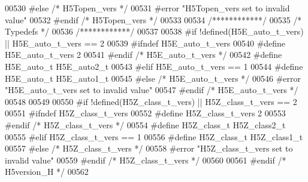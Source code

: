 \begin{DoxyCode}
00530 \textcolor{preprocessor}{#else }\textcolor{comment}{/* H5Topen\_vers */}\textcolor{preprocessor}{}
00531 \textcolor{preprocessor}{  #error "H5Topen\_vers set to invalid value"}
00532 \textcolor{preprocessor}{#endif }\textcolor{comment}{/* H5Topen\_vers */}\textcolor{preprocessor}{}
00533 
00534 \textcolor{comment}{/************/}
00535 \textcolor{comment}{/* Typedefs */}
00536 \textcolor{comment}{/************/}
00537 
00538 \textcolor{preprocessor}{#if !defined(H5E\_auto\_t\_vers) || H5E\_auto\_t\_vers == 2}
00539 \textcolor{preprocessor}{  #ifndef H5E\_auto\_t\_vers}
00540 \textcolor{preprocessor}{    #define H5E\_auto\_t\_vers 2}
00541 \textcolor{preprocessor}{  #endif }\textcolor{comment}{/* H5E\_auto\_t\_vers */}\textcolor{preprocessor}{}
00542 \textcolor{preprocessor}{  #define H5E\_auto\_t H5E\_auto2\_t}
00543 \textcolor{preprocessor}{#elif H5E\_auto\_t\_vers == 1}
00544 \textcolor{preprocessor}{  #define H5E\_auto\_t H5E\_auto1\_t}
00545 \textcolor{preprocessor}{#else }\textcolor{comment}{/* H5E\_auto\_t\_vers */}\textcolor{preprocessor}{}
00546 \textcolor{preprocessor}{  #error "H5E\_auto\_t\_vers set to invalid value"}
00547 \textcolor{preprocessor}{#endif }\textcolor{comment}{/* H5E\_auto\_t\_vers */}\textcolor{preprocessor}{}
00548 
00549 
00550 \textcolor{preprocessor}{#if !defined(H5Z\_class\_t\_vers) || H5Z\_class\_t\_vers == 2}
00551 \textcolor{preprocessor}{  #ifndef H5Z\_class\_t\_vers}
00552 \textcolor{preprocessor}{    #define H5Z\_class\_t\_vers 2}
00553 \textcolor{preprocessor}{  #endif }\textcolor{comment}{/* H5Z\_class\_t\_vers */}\textcolor{preprocessor}{}
00554 \textcolor{preprocessor}{  #define H5Z\_class\_t H5Z\_class2\_t}
00555 \textcolor{preprocessor}{#elif H5Z\_class\_t\_vers == 1}
00556 \textcolor{preprocessor}{  #define H5Z\_class\_t H5Z\_class1\_t}
00557 \textcolor{preprocessor}{#else }\textcolor{comment}{/* H5Z\_class\_t\_vers */}\textcolor{preprocessor}{}
00558 \textcolor{preprocessor}{  #error "H5Z\_class\_t\_vers set to invalid value"}
00559 \textcolor{preprocessor}{#endif }\textcolor{comment}{/* H5Z\_class\_t\_vers */}\textcolor{preprocessor}{}
00560 
00561 \textcolor{preprocessor}{#endif }\textcolor{comment}{/* H5version\_H */}\textcolor{preprocessor}{}
00562 
\end{DoxyCode}
